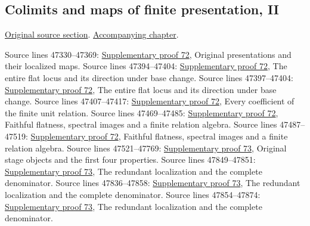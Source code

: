 \subsection{Colimits and maps of finite presentation, II}
\hypertarget{algebra-source-section-colimits-finite-presentation}{}
\noindent\href{https://github.com/stacks/stacks-project/blob/a04446e57ec1fbc252a871afcec7752fb2807b14/algebra.tex\#L47319}{Original source section}. \href{algebra.pdf\#nameddest=section-colimits-finite-presentation}{Accompanying chapter}.

\begin{AlgebraSourceRoutes}
 Source lines 47330--47369: \hyperlink{algebra_fp_flat_notes_20260929}{Supplementary proof 72}, Original presentations and their localized maps.
 Source lines 47394--47404: \hyperlink{algebra_fp_flat_notes_20260929}{Supplementary proof 72}, The entire flat locus and its direction under base change.
 Source lines 47397--47404: \hyperlink{algebra_fp_flat_notes_20260929}{Supplementary proof 72}, The entire flat locus and its direction under base change.
 Source lines 47407--47417: \hyperlink{algebra_fp_flat_notes_20260929}{Supplementary proof 72}, Every coefficient of the finite unit relation.
 Source lines 47469--47485: \hyperlink{algebra_fp_flat_notes_20260929}{Supplementary proof 72}, Faithful flatness, spectral images and a finite relation algebra.
 Source lines 47487--47519: \hyperlink{algebra_fp_flat_notes_20260929}{Supplementary proof 72}, Faithful flatness, spectral images and a finite relation algebra.
 Source lines 47521--47769: \hyperlink{algebra_fp_end_notes_20260929}{Supplementary proof 73}, Original stage objects and the first four properties.
 Source lines 47849--47851: \hyperlink{algebra_fp_end_notes_20260929}{Supplementary proof 73}, The redundant localization and the complete denominator.
 Source lines 47836--47858: \hyperlink{algebra_fp_end_notes_20260929}{Supplementary proof 73}, The redundant localization and the complete denominator.
 Source lines 47854--47874: \hyperlink{algebra_fp_end_notes_20260929}{Supplementary proof 73}, The redundant localization and the complete denominator.
\end{AlgebraSourceRoutes}

